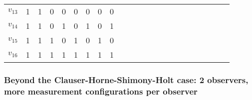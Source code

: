 \documentclass[%
  twocolumn,
 showpacs,
 showkeys,
 preprintnumbers,
 amsmath,amssymb,
 aps,
  pra,
  longbibliography,
 floatfix,
 ]{revtex4-1}
\begin{document}
\begin{table}
\begin{center}
\begin{ruledtabular}
\begin{tabular}{ccccccccccccccccccccccc}
$v_{13}$&1  &  1 &   0 &   0  & {\color{green}  0}&   {\color{green}  0} &  {\color{green}   0}  &  {\color{green}  0}\\
$v_{14}$&1  &  1 &   0 &   1  & {\color{red}  0}&   {\color{red}  1} &  {\color{red}  0}  &  {\color{red}  1}\\
$v_{15}$&1  &  1 &   1 &   0  & {\color{red}  1}&   {\color{red}  0} &  {\color{red}  1}  &  {\color{red}  0}\\
$v_{16}$&1  &  1 &   1 &   1  & {\color{red}  1}&   {\color{red}  1} &  {\color{red}  1}  &  {\color{red}  1}
\end{tabular}
 \end{ruledtabular}
 \end{center}
 \end{table}




\subsubsection{Beyond the Clauser-Horne-Shimony-Holt case: 2 observers, more measurement configurations per observer}
\label{2017-b-chshc1b}
\end{document}

